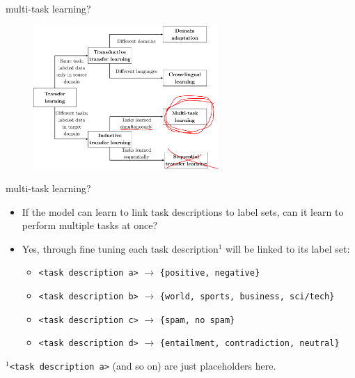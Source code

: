 \begin{frame}{multi-task learning?}

\vfill

\begin{figure}
	\centering
		\includegraphics[width = 7cm]{figure/62-transfer_learning_taxonomy-anno.png}\\ 
\end{figure}

\vfill

\end{frame}


\begin{frame}{multi-task learning?}

\vfill

\begin{itemize}
	\item \ques If the model can learn to link task descriptions to label sets, can it learn to perform multiple tasks at once?
	\item Yes, through fine tuning each task description$^1$ will be linked to its label set:
			\begin{itemize}
				\item \texttt{<task description a>} $\to$ \texttt{\{positive, negative\}}
				\item \texttt{<task description b>} $\to$ \texttt{\{world, sports, business, sci/tech\}} 
				\item \texttt{<task description c>} $\to$ \texttt{\{spam, no spam\}}
				\item \texttt{<task description d>} $\to$ \texttt{\{entailment, contradiction, neutral\}}
			\end{itemize}
\end{itemize}

\vfill

$^1$\footnotesize{\texttt{<task description a>} (and so on) are just placeholders here.}
\end{frame}

